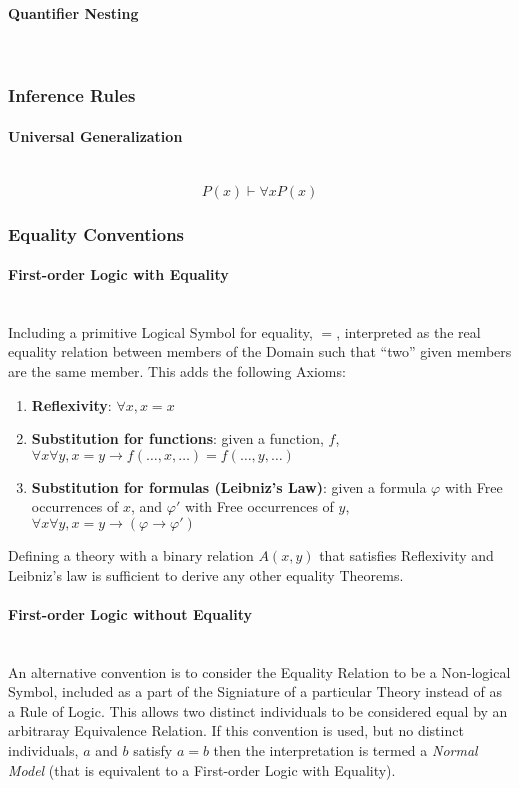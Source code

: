 \documentclass{article}
\begin{document}
\paragraph{Quantifier Nesting}\hfill
\\

\subsubsection{Inference Rules}

\paragraph{Universal Generalization}\label{subsec:universal_generalization} \hfill
\\
\[P(x) \vdash \forall x P(x)\]

\subsubsection{Equality Conventions}\label{subsec:first_order_equality}

\paragraph{First-order Logic with Equality}\hfill
\\ Including a primitive Logical Symbol for equality, $=$, interpreted
as the real equality relation between members of the Domain such that
``two'' given members are the same member. This adds the following
Axioms:

\begin{enumerate}
\item \textbf{Reflexivity}: $\forall x, x=x$
\item \textbf{Substitution for functions}: given a function, $f$,
  $\forall x \forall y, x = y \rightarrow f(\ldots,x,\ldots) =
  f(\ldots,y,\ldots)$
\item \textbf{Substitution for formulas (Leibniz's Law)}: given a
  formula $\varphi$ with Free occurrences of $x$, and $\varphi '$ with
  Free occurrences of $y$, $\forall x \forall y, x = y \rightarrow
  (\varphi \rightarrow \varphi ')$
\end{enumerate}

Defining a theory with a binary relation $A(x,y)$ that satisfies
Reflexivity and Leibniz's law is sufficient to derive any other
equality Theorems.

\paragraph{First-order Logic without Equality} \hfill
\\ An alternative convention is to consider the Equality Relation to
be a Non-logical Symbol, included as a part of the Signiature of a
particular Theory instead of as a Rule of Logic. This allows two
distinct individuals to be considered equal by an arbitraray
Equivalence Relation. If this convention is used, but no distinct
individuals, $a$ and $b$ satisfy $a=b$ then the interpretation is
termed a \emph{Normal Model} (that is equivalent to a First-order
Logic with Equality).
\end{document}
